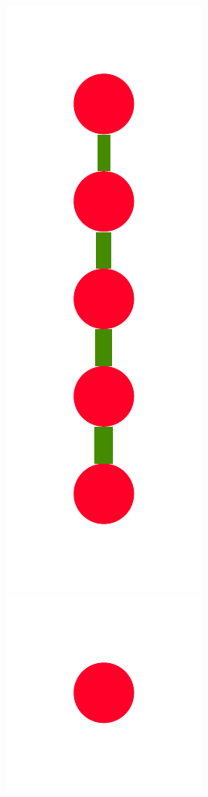 \documentclass[a4paper,10pt]{article}
\begin{document}
\begin{figure}
{    \includegraphics[scale=.14]{./figures/6-3-recursion-data-5.pdf}
    \includegraphics[scale=.14]{./figures/6-3-recursion-data-6.pdf}
}
\end{figure}
\end{document}
